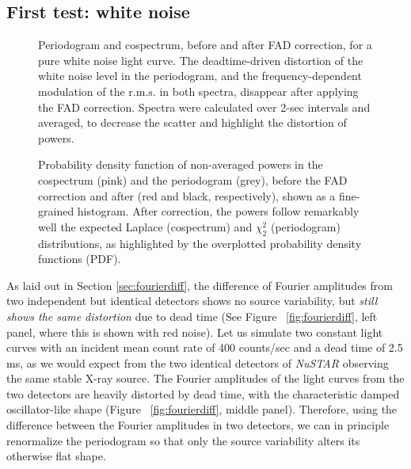 \documentclass[twocolumn]{aastex61}
\newcommand{\project}[1]{\textsl{#1}}
\newcommand{\nustar}{\project{NuSTAR}\xspace}
\newcommand{\rms}{\ensuremath{\mathrm{r.m.s.}}\xspace}
\begin{document}

\subsection{First test: white noise} \label{sec:wndeadtime}

\begin{figure*}
\caption{Periodogram and cospectrum, before and after FAD correction, for a pure white noise light curve. 
The deadtime-driven distortion of the white noise level in the periodogram, and the frequency-dependent modulation of the \rms in both spectra, disappear after applying the FAD correction. 
Spectra were calculated over 2-sec intervals and averaged, to decrease the scatter and highlight the distortion of powers.}
\label{fig:comparison}
\end{figure*}

\begin{figure*}
\caption{Probability density function of non-averaged powers in the cospectrum (pink) and the periodogram (grey), before the FAD correction and after (red and black, respectively), shown as a fine-grained histogram. 
After correction, the powers follow remarkably well the expected Laplace (cospectrum) and $\chi^2_2$ (periodogram) distributions, as highlighted by the overplotted probability density functions (PDF).}
\label{fig:dist}
\end{figure*}

As laid out in Section \ref{sec:fourierdiff}, the difference of Fourier amplitudes from two independent but identical detectors shows no source variability, but \textit{still shows the same distortion} due to dead time (See Figure ~\ref{fig:fourierdiff}, left panel, where this is shown with red noise).
Let us simulate two constant light curves with an incident mean count rate of 400 counts/sec and a dead time of 2.5 ms, as we would expect from the two identical detectors of \nustar observing the same stable X-ray source.
The Fourier amplitudes of the light curves from the two detectors are heavily distorted by dead time, with the characteristic damped oscillator-like shape \citep{Vikhlinin+94,Zhang+95}  (Figure ~\ref{fig:fourierdiff}, middle panel). 
Therefore, using the difference between the Fourier amplitudes in two detectors, we can in principle renormalize the periodogram so that only the source variability alters its otherwise flat shape.
\end{document}
